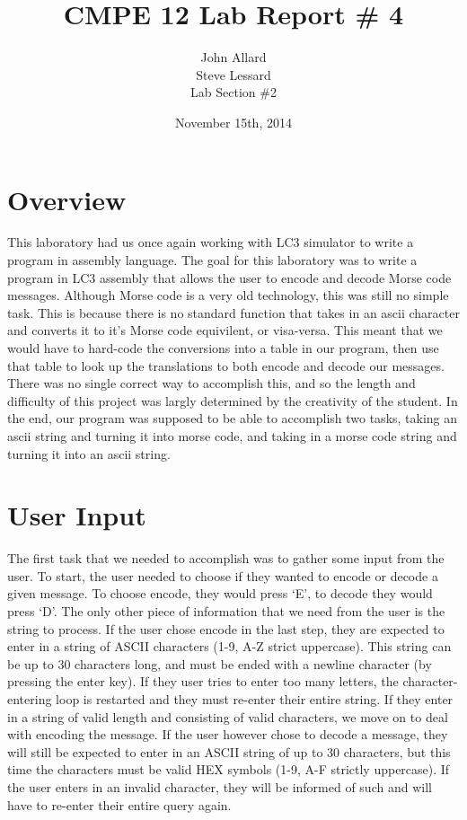 \documentclass[a4paper,11pt]{article}
\title{ CMPE 12 Lab Report \# 4 \\[7 in]}
\author{John Allard \\ Steve Lessard \\ Lab Section \#2}
\date{November 15th, 2014}
\begin{document}
\maketitle


\section{Overview}
This laboratory had us once again working with LC3 simulator to write a program in assembly language. The goal for this laboratory was to write a program in LC3 assembly that allows the user to encode and decode Morse code messages. Although Morse code is a very old technology, this was still no simple task. This is because there is no standard function that takes in an ascii character and converts it to it's Morse code equivilent, or visa-versa. This meant that we would have to hard-code the conversions into a table in our program, then use that table to look up the translations to both encode and decode our messages. There was no single correct way to accomplish this, and so the length and difficulty of this project was largly determined by the creativity of the student. In the end, our program was supposed to be able to accomplish two tasks, taking an ascii string and turning it into morse code, and taking in a morse code string and turning it into an ascii string.

\section{User Input}
The first task that we needed to accomplish was to gather some input from the user. To start, the user needed to choose if they wanted to encode or decode a given message. To choose encode, they would press `E', to decode they would press `D'. The only other piece of information that we need from the user is the string to process. If the user chose encode in the last step, they are expected to enter in a string of ASCII characters (1-9, A-Z strict uppercase). This string can be up to 30 characters long, and must be ended with a newline character (by pressing the enter key). If they user tries to enter too many letters, the character-entering loop is restarted and they must re-enter their entire string. If they enter in a string of valid length and consisting of valid characters, we move on to deal with encoding the message. If the user however chose to decode a message, they will still be expected to enter in an ASCII string of up to 30 characters, but this time the characters must be valid HEX symbols (1-9, A-F strictly uppercase). If the user enters in an invalid character, they will be informed of such and will have to re-enter their entire query again. 
\end{document}
